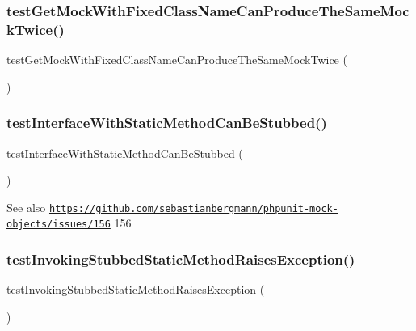 \subsubsection{\texorpdfstring{test\+Get\+Mock\+With\+Fixed\+Class\+Name\+Can\+Produce\+The\+Same\+Mock\+Twice()}{testGetMockWithFixedClassNameCanProduceTheSameMockTwice()}}
{\footnotesize\ttfamily test\+Get\+Mock\+With\+Fixed\+Class\+Name\+Can\+Produce\+The\+Same\+Mock\+Twice (\begin{DoxyParamCaption}{ }\end{DoxyParamCaption})}

\mbox{\label{class_framework___mock_object_test_a226859d52cb204968b7efedf060d1569}} 
\subsubsection{\texorpdfstring{test\+Interface\+With\+Static\+Method\+Can\+Be\+Stubbed()}{testInterfaceWithStaticMethodCanBeStubbed()}}
{\footnotesize\ttfamily test\+Interface\+With\+Static\+Method\+Can\+Be\+Stubbed (\begin{DoxyParamCaption}{ }\end{DoxyParamCaption})}

\begin{DoxySeeAlso}{See also}
\href{https://github.com/sebastianbergmann/phpunit-mock-objects/issues/156}{\tt https\+://github.\+com/sebastianbergmann/phpunit-\/mock-\/objects/issues/156}  156 
\end{DoxySeeAlso}
\mbox{\label{class_framework___mock_object_test_a1244ef4b127e7005f335ecbdd5ae7e70}} 
\subsubsection{\texorpdfstring{test\+Invoking\+Stubbed\+Static\+Method\+Raises\+Exception()}{testInvokingStubbedStaticMethodRaisesException()}}
{\footnotesize\ttfamily test\+Invoking\+Stubbed\+Static\+Method\+Raises\+Exception (\begin{DoxyParamCaption}{ }\end{DoxyParamCaption})}

